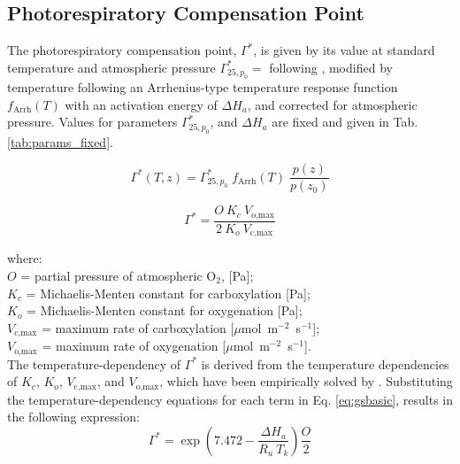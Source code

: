 \documentclass{myreport}
\begin{document}
\subsection{Photorespiratory Compensation Point}
\label{sec:gs}
The photorespiratory compensation point, $\Gamma^\ast$, is given by its value at standard temperature and atmospheric pressure $\Gamma^\ast_{25, p_0} = $ following \cite{bernacchi01xxx}, modified by temperature following an Arrhenius-type temperature response function $f_{\text{Arrh}}(T)$ with an activation energy of $\Delta H_a$, and corrected for atmospheric pressure. Values for parameters $\Gamma^\ast_{25, p_0}$, and $\Delta H_a$ are fixed and given in Tab. \ref{tab:params_fixed}.

\begin{equation}
\label{eq:gammastar}
    \Gamma^\ast (T, z) = \Gamma^\ast_{25, p_0} \; f_{\text{Arrh}}(T) \; \frac{p(z)}{p(z_0)}
\end{equation}


\begin{equation}
\label{eq:gsbasic}
    \Gamma^\ast = \frac{O\: K_c\: V_\text{o,max}}
                        {2\: K_o\: V_\text{c,max}}
\end{equation}

\noindent where:\\
\indent $O$ = partial pressure of atmospheric O$_2$, [Pa];\\
\indent $K_c$ = Michaelis-Menten constant for carboxylation [Pa];\\
\indent $K_o$ = Michaelis-Menten constant for oxygenation [Pa];\\
\indent $V_\text{c,max}$ = maximum rate of carboxylation [$\mu$mol~m$^{-2}$~s$^{-1}$];\\
\indent $V_\text{o,max}$ = maximum rate of oxygenation [$\mu$mol~m$^{-2}$~s$^{-1}$].\\

\noindent The temperature-dependency of $\Gamma^\ast$ is derived from the temperature dependencies of $K_c$, $K_o$, $V_\text{c,max}$, and $V_\text{o,max}$, which have been empirically solved by \cite{bernacchi01}. 
Substituting the temperature-dependency equations for each term in Eq. \ref{eq:gsbasic}, results in the following expression:
\begin{equation}
\label{eq:gst}
    \Gamma^\ast = \exp \left(7.472 - \frac{\Delta H_a}{R_u\: T_k}\right) \frac{O}{2}
\end{equation}
\end{document}
